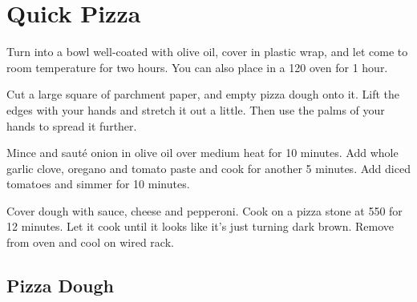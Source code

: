 \section{Quick Pizza}
\begin{recipe}



Turn into a bowl well-coated with olive oil, cover in plastic wrap, and let
come to room temperature for two hours. You can also place in a 120\degree{} oven
for 1 hour.

Cut a large square of parchment paper, and empty pizza dough onto it. Lift the
edges with your hands and stretch it out a little. Then use the palms of your
hands to spread it further.


Mince and sauté onion in olive oil over medium heat for 10 minutes. Add whole
garlic clove, oregano and tomato paste and cook for another 5 minutes. Add
diced tomatoes and simmer for 10 minutes.


Cover dough with sauce, cheese and pepperoni. Cook on a pizza stone at 550\degree{} for 12 minutes.
Let it cook until it looks like it's just turning dark brown. Remove from oven
and cool on wired rack.


\subsection{Pizza Dough}


\end{recipe}
